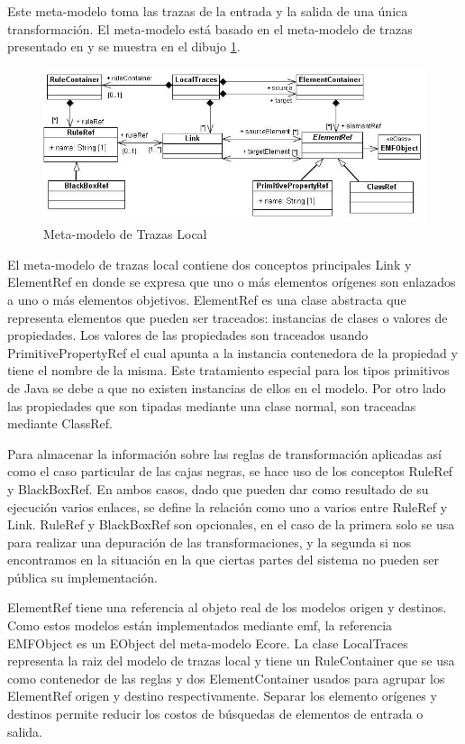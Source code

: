\documentclass[a4paper,12pt,oneside,spanish]{book}
\begin{document}
Este meta-modelo toma las trazas de la entrada y la salida de una única transformación. El meta-modelo está basado en el meta-modelo de trazas presentado en \cite{Jouault} y se muestra en el dibujo \ref{fig:LocalTraceMetamodel}.

\begin{figure}[hbtp]
\centering
\includegraphics[scale=.55]{./img/LocalTraceMetamodel}
\caption{Meta-modelo de Trazas Local}
\label{fig:LocalTraceMetamodel}
\end{figure}

El meta-modelo de trazas local contiene dos conceptos principales Link y ElementRef en donde se expresa que uno o más elementos orígenes son enlazados a uno o más elementos objetivos. ElementRef es una clase abstracta que representa elementos que pueden ser traceados: instancias de clases o valores de propiedades. Los valores de las propiedades son traceados usando PrimitivePropertyRef el cual apunta a la instancia contenedora de la propiedad y tiene el nombre de la misma. Este tratamiento especial para los tipos primitivos de Java se debe a que no existen instancias de ellos en el modelo. Por otro lado las propiedades que son tipadas mediante una clase normal, son traceadas mediante ClassRef.

Para almacenar la información sobre las reglas de transformación aplicadas así como el caso particular de las cajas negras, se hace uso de los conceptos RuleRef y BlackBoxRef. En ambos casos, dado que pueden dar como resultado de su ejecución varios enlaces, se define la relación como uno a varios entre RuleRef y Link. RuleRef y BlackBoxRef son opcionales, en el caso de la primera solo se usa para realizar una depuración de las transformaciones, y la segunda si nos encontramos en la situación en la que ciertas partes del sistema no pueden ser pública su implementación.

ElementRef tiene una referencia al objeto real de los modelos origen y destinos. Como estos modelos están implementados mediante \gls{emf}, la referencia EMFObject es un EObject del meta-modelo Ecore. La clase LocalTraces representa la raiz del modelo de trazas local y tiene un RuleContainer que se usa como contenedor de las reglas y dos ElementContainer usados para agrupar los ElementRef origen y destino respectivamente. Separar los elemento orígenes y destinos permite reducir los costos de búsquedas de elementos de entrada o salida.
\end{document}
